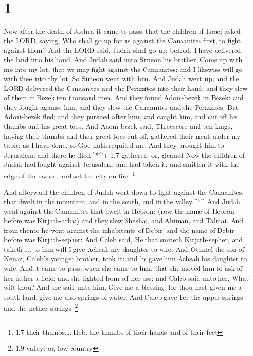 \hypertarget{section}{%
\section{1}\label{section}}

 Now after the death of Joshua it came to pass, that the
children of Israel asked the LORD, saying, Who shall go up for us
against the Canaanites first, to fight against them?  And
the LORD said, Judah shall go up: behold, I have delivered the land into
his hand.  And Judah said unto Simeon his brother, Come up
with me into my lot, that we may fight against the Canaanites; and I
likewise will go with thee into thy lot. So Simeon went with him.
 And Judah went up; and the LORD delivered the Canaanites
and the Perizzites into their hand: and they slew of them in Bezek ten
thousand men.  And they found Adoni-bezek in Bezek: and they
fought against him, and they slew the Canaanites and the Perizzites.
 But Adoni-bezek fled; and they pursued after him, and
caught him, and cut off his thumbs and his great toes.  And
Adoni-bezek said, Threescore and ten kings, having their thumbs and
their great toes cut off, gathered their meat under my table: as I have
done, so God hath requited me. And they brought him to Jerusalem, and
there he died.\^{}*\^{}+ 1.7 gathered: or, gleaned  Now the
children of Judah had fought against Jerusalem, and had taken it, and
smitten it with the edge of the sword, and set the city on fire.
\footnote{1.7 their thumbs\ldots: Heb. the thumbs of their hands and of
  their feet}

 And afterward the children of Judah went down to fight
against the Canaanites, that dwelt in the mountain, and in the south,
and in the valley.\^{}*\^{}  And Judah went against the
Canaanites that dwelt in Hebron: (now the name of Hebron before was
Kirjath-arba:) and they slew Sheshai, and Ahiman, and Talmai.
 And from thence he went against the inhabitants of Debir:
and the name of Debir before was Kirjath-sepher:  And Caleb
said, He that smiteth Kirjath-sepher, and taketh it, to him will I give
Achsah my daughter to wife.  And Othniel the son of Kenaz,
Caleb's younger brother, took it: and he gave him Achsah his daughter to
wife.  And it came to pass, when she came to him, that she
moved him to ask of her father a field: and she lighted from off her
ass; and Caleb said unto her, What wilt thou?  And she said
unto him, Give me a blessing: for thou hast given me a south land; give
me also springs of water. And Caleb gave her the upper springs and the
nether springs. \footnote{1.9 valley: or, low country}

